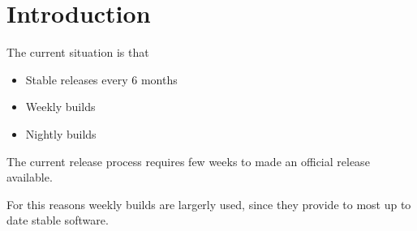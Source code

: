 \section{Introduction} \label{sec:intro}

The current situation is  that 
\begin{itemize}
\item Stable releases every 6 months 
\item Weekly builds
\item Nightly builds 
\end{itemize}

The current release process requires few weeks to made an official release available.

For this reasons weekly builds are largerly used, since they provide to most up to date stable software.


